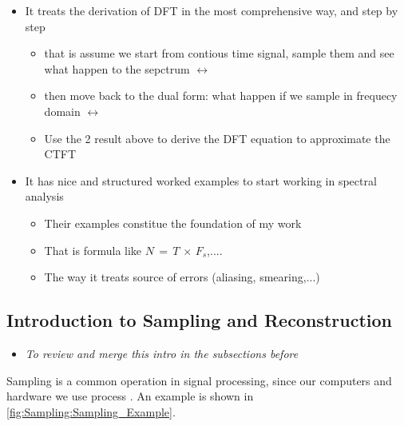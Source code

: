\begin{itemize}

\item It treats the derivation of DFT in the most comprehensive way, and step by step

	\begin{itemize}
	\item that is assume we start from contious time signal, sample them and see what happen to the sepctrum $\leftrightarrow$ 
	
	\item then move back to the dual form: what happen if we sample in frequecy domain $\leftrightarrow$ 
	
	\item Use the 2 result above to derive the DFT equation to approximate the CTFT
	\end{itemize}


\item It has nice and structured worked examples to start working in spectral analysis

	\begin{itemize}
	\item Their examples constitue the foundation of my work
	
	\item That is formula like $N \, = \, T \, \times \, F_s$,....
	
	\item The way it treats source of errors (aliasing, smearing,...)
	\end{itemize}

\end{itemize}


\newpage
\subsection{Introduction to Sampling and Reconstruction}

 

\begin{itemize}

\item \textit{To review and merge this intro in the subsections before}

\end{itemize}

Sampling is a common operation in signal processing, since our computers and hardware we use process . An example is shown in \autoref{fig:Sampling:Sampling_Example}.


